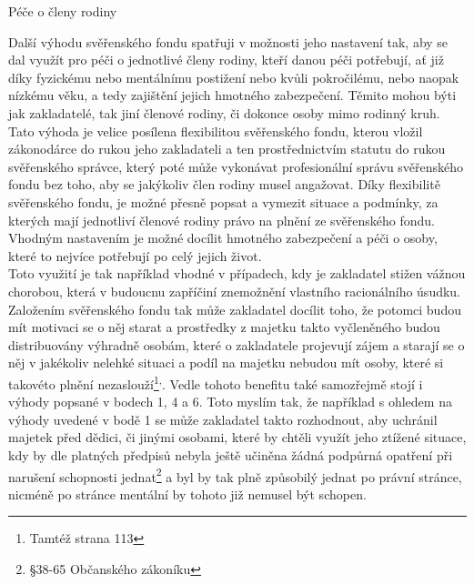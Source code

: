 \documentclass{article}
\begin{document}
 
 \newpage
 \thispagestyle{smallertextinheader}
 
  \begin{enumerate}
 {\Large\item[5.] Péče o členy rodiny}
 \end{enumerate}
 
 Další výhodu svěřenského fondu spatřuji v možnosti jeho nastavení tak, aby se dal využít pro péči o jednotlivé členy rodiny, kteří danou péči potřebují, ať již díky fyzickému nebo mentálnímu postižení nebo kvůli pokročilému, nebo naopak nízkému věku, a tedy zajištění jejich hmotného zabezpečení. Těmito mohou býti jak zakladatelé, tak jiní členové rodiny, či dokonce osoby mimo rodinný kruh. Tato výhoda je velice posílena flexibilitou svěřenského fondu, kterou vložil zákonodárce do rukou jeho zakladateli a ten prostřednictvím statutu do rukou svěřenského správce, který poté může vykonávat profesionální správu svěřenského fondu bez toho, aby se jakýkoliv člen rodiny musel angažovat. Díky flexibilitě svěřenského fondu, je možné přesně popsat a vymezit situace a podmínky, za kterých mají jednotliví členové rodiny právo na plnění ze svěřenského fondu. Vhodným nastavením je možné docílit hmotného zabezpečení a péči o osoby, které to nejvíce potřebují po celý jejich život.\\
 
 Toto využití je tak například vhodné v případech, kdy je zakladatel stižen vážnou chorobou, která v budoucnu zapříčiní znemožnění vlastního racionálního úsudku. Založením svěřenského fondu tak může zakladatel docílit toho, že potomci budou mít motivaci se o něj starat a prostředky z majetku takto vyčleněného budou distribuovány výhradně osobám, které o zakladatele projevují zájem a starají se o něj v jakékoliv nelehké situaci a podíl na majetku nebudou mít osoby, které si takovéto plnění nezaslouží\footnote{Tamtéž strana 113}\textsuperscript{,}. Vedle tohoto benefitu také samozřejmě stojí i výhody popsané v bodech 1, 4 a 6. Toto myslím tak, že například s ohledem na výhody uvedené v bodě 1 se může zakladatel takto rozhodnout, aby uchránil majetek před dědici, či jinými osobami, které by chtěli využít jeho ztížené situace, kdy by dle platných předpisů nebyla ještě učiněna žádná podpůrná opatření při narušení schopnosti jednat\footnote{§38-65 Občanského zákoníku} a byl by tak plně způsobilý jednat po právní stránce, nicméně po stránce mentální by tohoto již nemusel být schopen.\\
 
\end{document}

